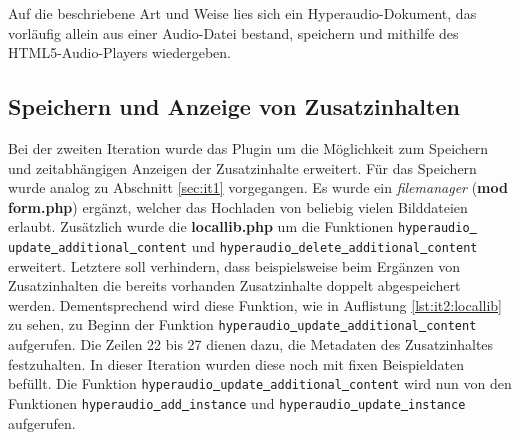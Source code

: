 Auf die beschriebene Art und Weise lies sich ein Hyperaudio-Dokument, das vorläufig allein aus einer Audio-Datei bestand, speichern und mithilfe des HTML5-Audio-Players wiedergeben.


\subsection{Speichern und Anzeige von Zusatzinhalten}
Bei der zweiten Iteration wurde das Plugin um die Möglichkeit zum Speichern und zeitabhängigen Anzeigen der Zusatzinhalte erweitert. Für das Speichern wurde analog zu Abschnitt \ref{sec:it1} vorgegangen. Es wurde ein \textit{filemanager} (\textbf{mod\underline{{ }}form.php}) ergänzt, welcher das Hochladen von beliebig vielen Bilddateien erlaubt. Zusätzlich wurde die \textbf{locallib.php} um die Funktionen \mbox{\texttt{hyperaudio\underline{{ }}update\underline{{ }}additional\underline{{ }}content}} und \mbox{\texttt{hyperaudio\underline{{ }}delete\underline{{ }}additional\underline{{ }}content}} erweitert. Letztere soll verhindern, dass beispielsweise beim Ergänzen von Zusatzinhalten die bereits vorhanden Zusatzinhalte doppelt abgespeichert werden. Dementsprechend wird diese Funktion, wie in Auflistung \ref{lst:it2:locallib} zu sehen, zu Beginn der Funktion \mbox{\texttt{hyperaudio\underline{{ }}update\underline{{ }}additional\underline{{ }}content}} aufgerufen. Die Zeilen 22 bis 27 dienen dazu, die Metadaten des Zusatzinhaltes festzuhalten. In dieser Iteration wurden diese noch mit fixen Beispieldaten befüllt. Die Funktion \mbox{\texttt{hyperaudio\underline{{ }}update\underline{{ }}additional\underline{{ }}content}} wird nun von den Funktionen \texttt{hyperaudio\underline{{ }}add\underline{{ }}instance} und \texttt{hyperaudio\underline{{ }}update\underline{{ }}instance} aufgerufen.

